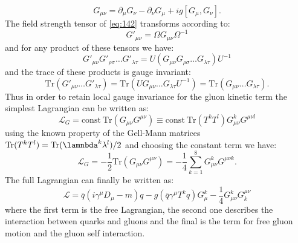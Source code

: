 \begin{equation}
  \label{eq:142}
  G_{\mu\nu} = \partial_\mu G_\nu - \partial_\nu G_\mu + ig \left[ G_\mu, G_\nu \right].
\end{equation}
The field strength tensor of \cref{eq:142} transforms according to:
\begin{equation}
  \label{eq:144}
  G'_{\mu\nu} = \Omega G_{\mu\nu} \Omega^{-1}
\end{equation}
and for any product of these tensors we have:
\begin{equation}
  \label{eq:145}
  G'_{\mu\nu} G'_{\rho \sigma} \dots G'_{\lambda \tau} = U \left( G_{\mu\nu}
    G_{\rho \sigma} \dots G_{\lambda \tau} \right) U^{-1}
\end{equation}
and the trace of these products is gauge invariant:
\begin{equation}
  \label{eq:146}
  \mathrm{Tr}(G'_{\mu\nu} \dots G'_{\lambda \tau}) = \mathrm{Tr}(UG_{\mu\nu}
  \dots G_{\lambda \tau}U^{-1}) = \mathrm{Tr}(G_{\mu\nu} \dots G_{\lambda \tau}).
\end{equation}
Thus in order to retain local gauge invariance for the gluon kinetic term the
simplest Lagrangian can be written as:
\begin{equation}
  \label{eq:143}
  \mathcal{L}_G = \mathrm{const~Tr}(G_{\mu\nu} G^{\mu\nu}) \equiv
  \mathrm{const~}\mathrm{Tr}(T^k T^l) G_{\mu\nu}^k G^{\mu\nu l}
\end{equation}
using the known property of the Gell-Mann matrices $\mathrm{Tr}(T^k T^l) =
\mathrm{Tr}(\lamnbda^k \lambda^l)/2$ and choosing the constant term we have:
\begin{equation}
  \label{eq:147}
  \mathcal{L}_G = - \frac{1}{2} \mathrm{Tr}(G_{\mu\nu}G^{\mu\nu}) = -
  \frac{1}{4} \sum_{k = 1}^8 G_{\mu\nu}^k G^{\mu\nu k}.
\end{equation}
The full Lagrangian can finally be written as:
\begin{equation}
  \label{eq:148}
  \mathcal{L} = \bar{q} \left( i \gamma^\mu D_\mu - m \right) q - g \left(
    \bar{q} \gamma^\mu T^k q \right) G_\mu^k - \frac{1}{4}G_{\mu\nu}^k G_k^{\mu\nu}
\end{equation}
where the first term is the free Lagrangian, the second one describes the
interaction between quarks and gluons and the final is the term for free gluon
motion and the gluon self interaction.
